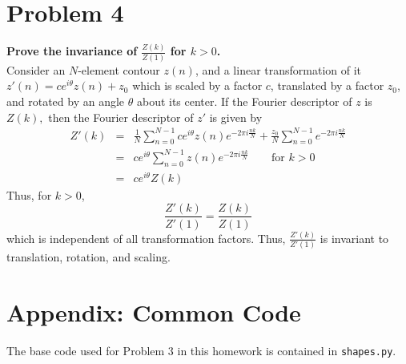 \documentclass[aps,letterpaper,10pt]{article}
\newcommand{\ttt}{\texttt}
\begin{document}
\section{Problem 4}
\textbf{Prove the invariance of  $\frac{Z(k)}{Z(1)}$  for $k>0$.}\\ 

\noindent Consider an $N$-element contour $z(n)$, and a linear transformation of it $z'(n) = c e^{i\theta} z(n) + z_0$ which is scaled by a factor $c$, translated by a factor $z_0$, and rotated by an angle $\theta$ about its center.  If the Fourier descriptor of $z$ is $Z(k),$ then the Fourier descriptor of $z'$ is given by 
\begin{eqnarray}
Z'(k) & = & \frac{1}{N} \sum_{n=0}^{N-1} c e^{i\theta} z(n) e^{-2\pi i \frac{n k}{N}}+ \frac{z_0}{N} \sum_{n=0}^{N-1} e^{-2\pi i \frac{n k}{N}} \nonumber \\
& = & c e^{i\theta}\sum_{n=0}^{N-1}z(n) e^{-2\pi i \frac{n k}{N}} \qquad\text{for $k>0$} \nonumber \\
& = & c e^{i\theta} Z(k)
\end{eqnarray}
Thus, for $k>0$, $$\frac{Z'(k)}{Z'(1)} = \frac{Z(k)}{Z(1)}$$ which is independent of all transformation factors.  Thus, $\frac{Z'(k)}{Z'(1)}$ is invariant to translation, rotation, and scaling.

\section{Appendix: Common Code}
The base code used for Problem 3 in this homework is contained in \ttt{shapes.py}.

\end{document}
